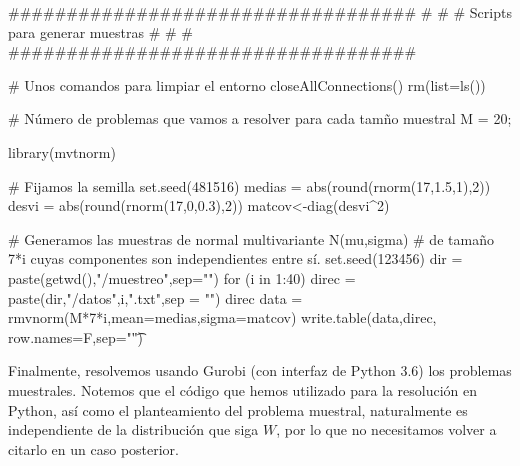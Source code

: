 \documentclass[twoside,a4paper,openright,12pt]{book}
\begin{document}
\begin{erre}
###################################
#                                 #
#  Scripts para generar muestras  #
#                                 #
###################################

# Unos comandos para limpiar el entorno
closeAllConnections()
rm(list=ls())

# Número de problemas que vamos a resolver para cada tamño muestral
M = 20;

library(mvtnorm)

# Fijamos la semilla
set.seed(481516)
medias = abs(round(rnorm(17,1.5,1),2))
desvi = abs(round(rnorm(17,0,0.3),2))
matcov<-diag(desvi^2)

# Generamos las muestras de normal multivariante N(mu,sigma) 
# de tamaño 7*i cuyas componentes son independientes entre sí. 
set.seed(123456)
dir = paste(getwd(),"/muestreo",sep="")
for (i in 1:40) {
  direc = paste(dir,"/datos",i,".txt",sep = "")
  direc
  data = rmvnorm(M*7*i,mean=medias,sigma=matcov)
  write.table(data,direc, row.names=F,sep="\t")
}
\end{erre}
Finalmente, resolvemos usando Gurobi (con interfaz de Python 3.6) los problemas muestrales. Notemos que el código que hemos utilizado para la resolución en Python, así como el planteamiento del problema muestral, naturalmente es independiente de la distribución que siga $W$, por lo que no necesitamos volver a citarlo en un caso posterior.
\end{document}
